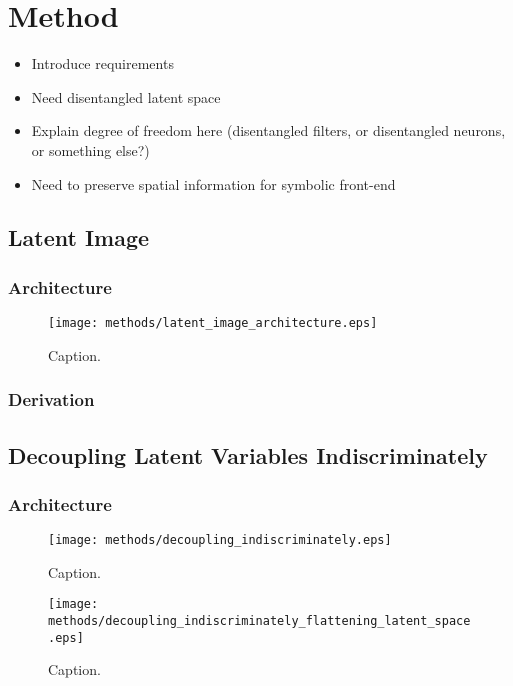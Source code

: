 \chapter{Method}
\begin{itemize}
\item Introduce requirements
\item Need disentangled latent space
\item Explain degree of freedom here (disentangled filters, or disentangled neurons, or something else?)
\item Need to preserve spatial information for symbolic front-end
\end{itemize}

\label{ch:method}

%
%
%
%
%
\section{Latent Image}
\lipsum[2]
\subsection{Architecture}
\begin{figure}[H]
\centering
\captionsetup{justification=centering}
\texttt{[image: methods/latent\_image\_architecture.eps]}
\caption{Caption.}
\label{fig:latent_image_architecture}
\end{figure}

\subsection{Derivation}

%
%
%
%
%
\section{Decoupling Latent Variables Indiscriminately}
\lipsum[2]
\subsection{Architecture}
\begin{figure}[H]
\centering
\captionsetup{justification=centering}
\texttt{[image: methods/decoupling\_indiscriminately.eps]}
\caption{Caption.}
\label{fig:decoupling_indiscriminately}
\end{figure}

\begin{figure}[H]
\centering
\captionsetup{justification=centering}
\texttt{[image: methods/decoupling\_indiscriminately\_flattening\_latent\_space.eps]}
\caption{Caption.}
\label{fig:decoupling_indiscriminately_flattening_latent_space}
\end{figure}

